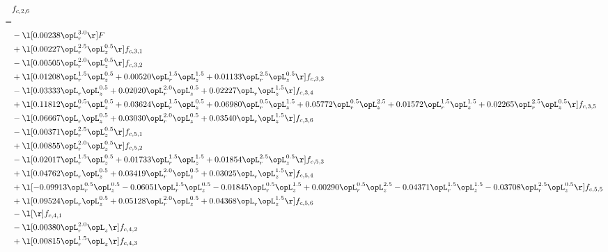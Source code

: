 \begin{alignat}{2} 
\label{eq:f_26_2} 
& f_{c,2,6} \nonumber \\ 
 = \\ 
& - \l[  0.00238 \opL_r^{3.0}  \r] F \nonumber \\ 
& + \l[  0.00227 \opL_r^{2.5} \opL_z^{0.5}  \r] f_{c,3,1} \nonumber \\ 
& - \l[  0.00505 \opL_r^{2.0} \opL_z^{0.5}  \r] f_{c,3,2} \nonumber \\ 
& + \l[  0.01208 \opL_r^{1.5} \opL_z^{0.5} +  0.00520 \opL_r^{1.5} \opL_z^{1.5} +  0.01133 \opL_r^{2.5} \opL_z^{0.5}  \r] f_{c,3,3} \nonumber \\ 
& - \l[  0.03333 \opL_r \opL_z^{0.5} +  0.02020 \opL_r^{2.0} \opL_z^{0.5} +  0.02227 \opL_r \opL_z^{1.5}  \r] f_{c,3,4} \nonumber \\ 
& + \l[  0.11812 \opL_r^{0.5} \opL_z^{0.5} +  0.03624 \opL_r^{1.5} \opL_z^{0.5} +  0.06980 \opL_r^{0.5} \opL_z^{1.5} +  0.05772 \opL_r^{0.5} \opL_z^{2.5} +  0.01572 \opL_r^{1.5} \opL_z^{1.5} +  0.02265 \opL_r^{2.5} \opL_z^{0.5}  \r] f_{c,3,5} \nonumber \\ 
& - \l[  0.06667 \opL_r \opL_z^{0.5} +  0.03030 \opL_r^{2.0} \opL_z^{0.5} +  0.03540 \opL_r \opL_z^{1.5}  \r] f_{c,3,6} \nonumber \\ 
& - \l[  0.00371 \opL_r^{2.5} \opL_z^{0.5}  \r] f_{c,5,1} \nonumber \\ 
& + \l[  0.00855 \opL_r^{2.0} \opL_z^{0.5}  \r] f_{c,5,2} \nonumber \\ 
& - \l[  0.02017 \opL_r^{1.5} \opL_z^{0.5} +  0.01733 \opL_r^{1.5} \opL_z^{1.5} +  0.01854 \opL_r^{2.5} \opL_z^{0.5}  \r] f_{c,5,3} \nonumber \\ 
& + \l[  0.04762 \opL_r \opL_z^{0.5} +  0.03419 \opL_r^{2.0} \opL_z^{0.5} +  0.03025 \opL_r \opL_z^{1.5}  \r] f_{c,5,4} \nonumber \\ 
& + \l[  -0.09913 \opL_r^{0.5} \opL_z^{0.5}   -0.06051 \opL_r^{1.5} \opL_z^{0.5}   -0.01845 \opL_r^{0.5} \opL_z^{1.5} +  0.00290 \opL_r^{0.5} \opL_z^{2.5}   -0.04371 \opL_r^{1.5} \opL_z^{1.5}   -0.03708 \opL_r^{2.5} \opL_z^{0.5}  \r] f_{c,5,5} \nonumber \\ 
& + \l[  0.09524 \opL_r \opL_z^{0.5} +  0.05128 \opL_r^{2.0} \opL_z^{0.5} +  0.04368 \opL_r \opL_z^{1.5}  \r] f_{c,5,6} \nonumber \\ 
& - \l[  \r] f_{c,4,1} \nonumber \\ 
& - \l[  0.00380 \opL_r^{2.0} \opL_z  \r] f_{c,4,2} \nonumber \\ 
& + \l[  0.00815 \opL_r^{1.5} \opL_z  \r] f_{c,4,3} \nonumber \\ 

\end{alignat}
